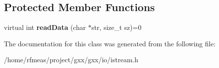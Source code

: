 \subsection*{Protected Member Functions}
\begin{DoxyCompactItemize}
\item 
virtual int {\bfseries read\+Data} (char $\ast$str, size\+\_\+t sz)=0\hypertarget{classgxx_1_1io_1_1istream_a1cfa288b174b358ac4ee515c77f6efc4}{}\label{classgxx_1_1io_1_1istream_a1cfa288b174b358ac4ee515c77f6efc4}

\end{DoxyCompactItemize}


The documentation for this class was generated from the following file\+:\begin{DoxyCompactItemize}
\item 
/home/rfmeas/project/gxx/gxx/io/istream.\+h\end{DoxyCompactItemize}
